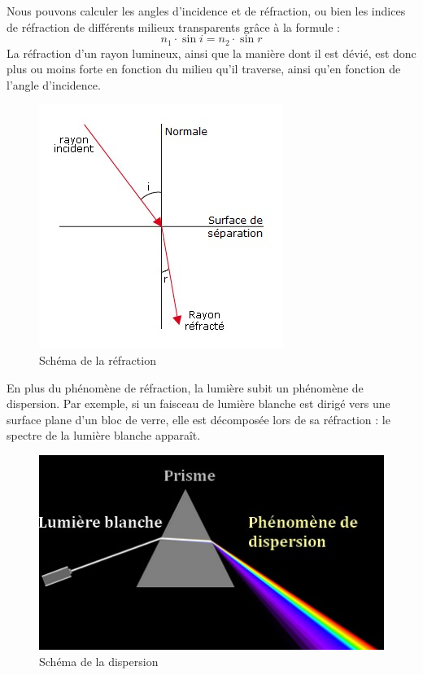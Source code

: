 \documentclass[a4paper, 12pt, onecolumn, openany]{report}
\begin{document}
	Nous pouvons calculer les angles d'incidence et de réfraction, ou bien les indices de réfraction de différents milieux transparents grâce à la formule :	
	\[
	n_{1} \cdot \sin i = n_{2} \cdot \sin r
	\]	
	La réfraction d’un rayon lumineux, ainsi que la manière dont il est dévié, est donc plus ou moins forte en fonction du milieu qu’il traverse, ainsi qu’en fonction de l’angle d’incidence.
	
	\begin{figure}
	\includegraphics[scale=0.6]{refraction.jpg}
	\caption{Schéma de la réfraction}
	\end{figure}	
	
	 En plus du phénomène de réfraction, la lumière subit un phénomène de dispersion. Par exemple, si un faisceau de lumière blanche est dirigé vers une surface plane d'un bloc de verre, elle est décomposée lors de sa réfraction : le spectre de la lumière blanche apparaît.
	 
	 \begin{figure}[h]
	 \begin{center}
	 \includegraphics[scale=0.73]{dispersion.jpg} 
	 \end{center}
	 \caption{Schéma de la dispersion}
	 \label{Schéma de la dispersion}
	 \end{figure}	 
	 
\end{document}
